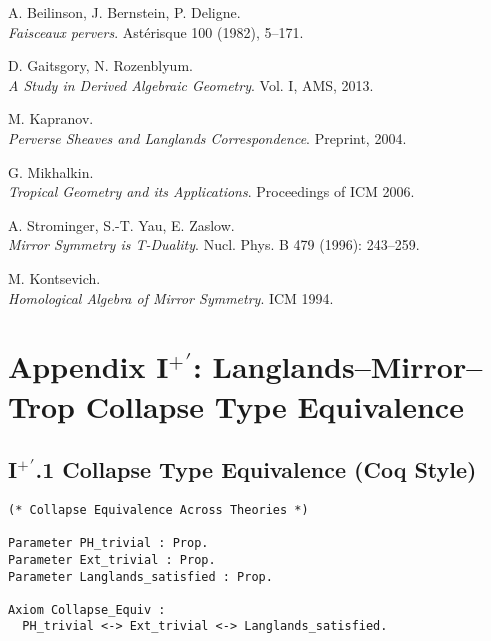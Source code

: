\documentclass[11pt]{article}
\begin{document}
\begin{thebibliography}{9}

A. Beilinson, J. Bernstein, P. Deligne.\\
\textit{Faisceaux pervers}. Astérisque 100 (1982), 5–171.

D. Gaitsgory, N. Rozenblyum.\\
\textit{A Study in Derived Algebraic Geometry}.  
Vol. I, AMS, 2013.

M. Kapranov.\\
\textit{Perverse Sheaves and Langlands Correspondence}.  
Preprint, 2004.

G. Mikhalkin.\\
\textit{Tropical Geometry and its Applications}.  
Proceedings of ICM 2006.

A. Strominger, S.-T. Yau, E. Zaslow.\\
\textit{Mirror Symmetry is T-Duality}.  
Nucl. Phys. B 479 (1996): 243–259.

M. Kontsevich.\\
\textit{Homological Algebra of Mirror Symmetry}.  
ICM 1994.

\end{thebibliography}



\section*{Appendix I$^+\!{}^\prime$: Langlands–Mirror–Trop Collapse Type Equivalence}

\subsection*{I$^+\!{}^\prime$.1 Collapse Type Equivalence (Coq Style)}

\begin{lstlisting}[language=Coq, caption=Collapse Type Equivalence in Coq]
(* Collapse Equivalence Across Theories *)

Parameter PH_trivial : Prop.
Parameter Ext_trivial : Prop.
Parameter Langlands_satisfied : Prop.

Axiom Collapse_Equiv :
  PH_trivial <-> Ext_trivial <-> Langlands_satisfied.
\end{lstlisting}
\end{document}
